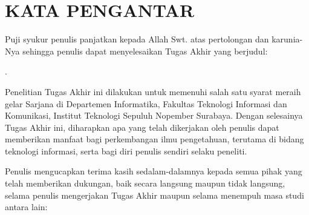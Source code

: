 \chapter{KATA PENGANTAR}
\indent\indent Puji syukur penulis panjatkan kepada Allah Swt. atas pertolongan dan karunia-Nya sehingga penulis dapat menyelesaikan Tugas Akhir yang berjudul:
\begin{center}
	\textbf{\MakeUppercase{\judul}}.
\end{center}

Penelitian Tugas Akhir ini dilakukan untuk memenuhi salah satu syarat meraih gelar Sarjana di Departemen Informatika, Fakultas Teknologi Informasi dan Komunikasi, Institut Teknologi Sepuluh Nopember Surabaya. Dengan selesainya Tugas Akhir ini, diharapkan apa yang telah dikerjakan oleh penulis dapat memberikan manfaat bagi perkembangan ilmu pengetahuan, terutama di bidang teknologi informasi, serta bagi diri penulis sendiri selaku peneliti.

Penulis mengucapkan terima kasih sedalam-dalamnya kepada semua pihak yang telah memberikan dukungan, baik secara langsung maupun tidak langsung, selama penulis mengerjakan Tugas Akhir maupun selama menempuh masa studi antara lain:

